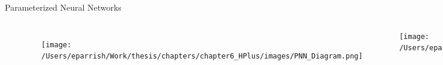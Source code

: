\documentclass[aspectratio=169,xcolor=table]{beamer}
\begin{document}
\begin{frame}[t]{Parameterized Neural Networks}
\begin{columns}[t]
\begin{itemize}
      \end{itemize}
      \footnotesize
      \centering      
      \begin{figure}
        \centering
        \begin{columns}
        \texttt{[image: /Users/eparrish/Work/thesis/chapters/chapter6\_HPlus/images/PNN\_Diagram.png]}  
        \caption{\tiny \cite{PNN}}
        \end{columns}
      \end{figure}
      \texttt{[image: /Users/eparrish/Work/thesis/chapters/chapter6\_HPlus/images/kFoldDiagram\_noValid.pdf]}
      \begin{table}
        \end{table}
        \vspace{-0.2cm}
        \begin{table}
\end{table}
\end{columns}
\end{frame}
\end{document}
